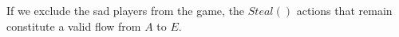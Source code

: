 \begin{proofsketch}
   If we exclude the sad players from the game, the $Steal\left(\right)$ actions that remain constitute a valid flow from
   $A$ to $E$.
\end{proofsketch}
